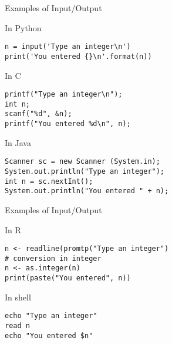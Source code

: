 \documentclass{beamer}
\begin{document}
\begin{frame}[fragile]{Examples of Input/Output}
  
  \begin{block}{In Python}
    \begin{lstlisting}[style=codePy]
n = input('Type an integer\n')
print('You entered {}\n'.format(n))
    \end{lstlisting}
  \end{block}
  
  \begin{block}{In C}
    \begin{lstlisting}[style=codeC]
printf("Type an integer\n");
int n;
scanf("%d", &n);
printf("You entered %d\n", n);
    \end{lstlisting}
  \end{block}
  
  \begin{block}{In Java}
    \begin{lstlisting}[style=codeJ]
Scanner sc = new Scanner (System.in);
System.out.println("Type an integer");
int n = sc.nextInt();
System.out.println("You entered " + n);
    \end{lstlisting}
  \end{block}
  
\end{frame}

\begin{frame}[fragile]{Examples of Input/Output}
  
  \begin{block}{In R}
    \begin{lstlisting}[style=codeR]
n <- readline(promtp("Type an integer")
# conversion in integer
n <- as.integer(n)
print(paste("You entered", n))
    \end{lstlisting}
  \end{block}
  
  \begin{block}{In shell}
    \begin{lstlisting}[style=codeS]
echo "Type an integer"
read n
echo "You entered $n"
    \end{lstlisting}
  \end{block}
  
\end{frame}
\end{document}

